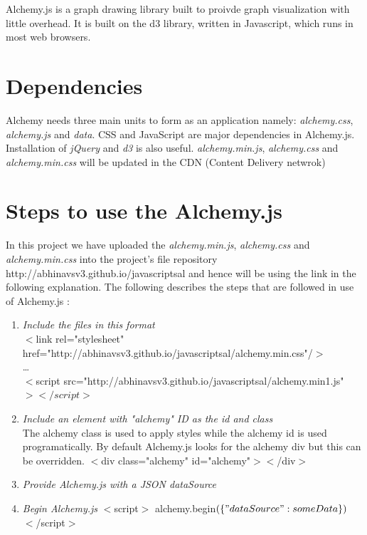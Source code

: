 Alchemy.js is a graph drawing library built to proivde graph visualization with little overhead. It is built on the d3 library, written in Javascript, which runs in most web browsers.   

\section{Dependencies}
Alchemy needs three main units to  form as an application namely:  \textit{alchemy.css}, \textit{alchemy.js} and \textit{data}. CSS and JavaScript are major dependencies in Alchemy.js. Installation of \textit{jQuery} and \textit{d3} is also useful. \textit{alchemy.min.js}, \textit{alchemy.css} and \textit{alchemy.min.css } will be updated in the CDN (Content Delivery netwrok)
\section{Steps to use the Alchemy.js}
 In this project we have uploaded the \textit{alchemy.min.js}, \textit{alchemy.css} and \textit{alchemy.min.css } into the project's file repository http://abhinavsv3.github.io/javascriptsal and hence will be using the link in the following explanation. 
The following describes the steps that are followed in use of Alchemy.js :
\begin{enumerate}

\item \textit{Include the files in this format}\\
$<$link rel="stylesheet" href="http://abhinavsv3.github.io/javascriptsal/alchemy.min.css"/$>$
\\
\ldots\\
$<$script src="http://abhinavsv3.github.io/javascriptsal/alchemy.min1.js"$></script>$

\item \textit{Include an element with "alchemy" ID as the id and class }\\
The alchemy class is used to apply styles while the alchemy id is used programatically. By default Alchemy.js looks for the alchemy div but this can be overridden.
$<$div class="alchemy" id="alchemy"$><$/div$>$

\item \textit{Provide Alchemy.js with a JSON dataSource}

\item \textit{Begin Alchemy.js}
$<$script$>$
  alchemy.begin$(\{"dataSource": someData\})$
$<$/script$>$



\end{enumerate}
